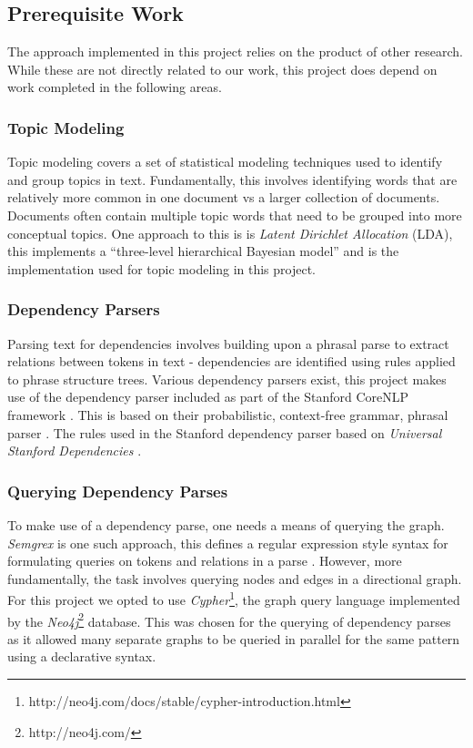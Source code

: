     \tocless\subsection{Prerequisite Work}
      The approach implemented in this project relies on the product of other research. While these are not directly related to our work, this project does depend on work completed in the following areas.

      \tocless\subsubsection{Topic Modeling}

        Topic modeling covers a set of statistical modeling techniques used to identify and group topics in text. Fundamentally, this involves identifying words that are relatively more common in one document vs a larger collection of documents. Documents often contain multiple topic words that need to be grouped into more conceptual topics. One approach to this is is \textit{Latent Dirichlet Allocation} (LDA), this implements a ``three-level hierarchical Bayesian model'' \cite{blei2003latent} and is the implementation used for topic modeling in this project.

      \tocless\subsubsection{Dependency Parsers}

        Parsing text for dependencies involves building upon a phrasal parse to extract relations between tokens in text - dependencies are identified using rules applied to phrase structure trees. Various dependency parsers exist, this project makes use of the dependency parser included as part of the Stanford CoreNLP framework \cite{de2006generating}. This is based on their probabilistic, context-free grammar, phrasal parser \cite{klein2003accurate}. The rules used in the Stanford dependency parser based on \textit{Universal Stanford Dependencies} \cite{de2014universal}.

      \tocless\subsubsection{Querying Dependency Parses}

        To make use of a dependency parse, one needs a means of querying the graph. \textit{Semgrex} is one such approach, this defines a regular expression style syntax for formulating queries on tokens and relations in a parse \cite{Chambers2007}. However, more fundamentally, the task involves querying nodes and edges in a directional graph. For this project we opted to use \textit{Cypher}\footnote{http://neo4j.com/docs/stable/cypher-introduction.html}, the graph query language implemented by the \textit{Neo4j}\footnote{http://neo4j.com/} database. This was chosen for the querying of dependency parses as it allowed many separate graphs to be queried in parallel for the same pattern using a declarative syntax.


